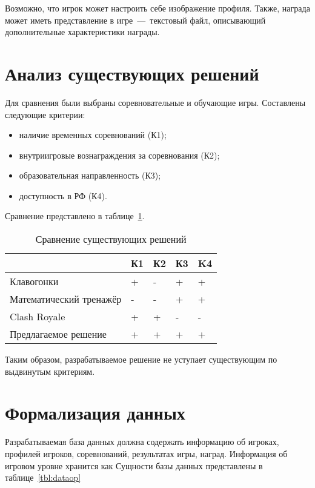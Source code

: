 Возможно, что игрок может настроить себе изображение профиля. Также, награда может иметь представление в игре~---~текстовый файл, описывающий дополнительные характеристики награды.



\section{Анализ существующих решений}

Для сравнения были выбраны соревновательные и обучающие игры. Составлены следующие критерии:
\begin{itemize}
	\item наличие временных соревнований (К1);
	\item внутриигровые вознаграждения за соревнования (К2);
	\item образовательная направленность (К3);
	\item доступность в РФ (К4).
\end{itemize}

Сравнение представлено в таблице~\ref{tbl:comparison}. 

\begin{table}[h!]
	\caption{\label{tbl:comparison}Сравнение существующих решений}
	\begin{tabular}{|l|l|l|l|l|}
		\hline
		& К1 & К2 & К3 & K4\\\hline
		Клавогонки & + & - & + & + \\\hline
		Математический тренажёр & - & - & + & +\\\hline
		Clash Royale  & + & + & - & -\\\hline
		Предлагаемое решение & + & + & + & + \\\hline
	\end{tabular}
\end{table}
\FloatBarrier

Таким образом, разрабатываемое решение не уступает существующим по выдвинутым критериям.

\section{Формализация данных}
Разрабатываемая база данных должна содержать информацию об игроках, профилей игроков, соревнований, результатах игры, наград. Информация об игровом уровне хранится как Сущности базы данных представлены в таблице~\ref{tbl:dataop}

